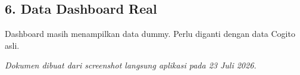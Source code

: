 \documentclass[11pt,a4paper]{article}
\begin{document}
\subsection*{6. Data Dashboard Real}
Dashboard masih menampilkan data dummy. Perlu diganti dengan data Cogito asli.

\vfill

\begin{center}
\textit{Dokumen dibuat dari screenshot langsung aplikasi pada 23 Juli 2026.}
\end{center}
\end{document}
